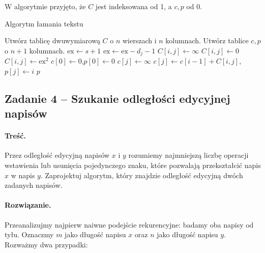 W algorytmie przyjęto, że $C$ jest indeksowana od 1, a $c,p$ od 0.
\begin{algorithm}[H]
	\caption{Algorytm łamania tekstu}\label{Zadanie13}

	\begin{algorithmic}[1]
			\State Utwórz tablicę dwuwymiarową $C$ o $n$ wierszach i $n$ kolumnach.
			\State Utwórz tablice $c,p$ o $n+1$ kolumnach.
				\State $\textrm{ex}\gets s+1$
					\State $\textrm{ex}\gets \textrm{ex} - d_j - 1$
						\State $C[i,j]\gets\infty$
						\State $C[i,j]\gets0$
					\Else
						\State $C[i,j]\gets\textrm{ex}^2$
					\EndIf
				\EndFor
			\EndFor
			\State $c[0]\gets0$,\quad$p[0]\gets0$
				\State $c[j]\gets\infty$
						\State $c[j]\gets c[i-1]+C[i,j]$,\qquad$p[j]\gets i$
					\EndIf
				\EndFor
			\EndFor
			\State \Return $p$
		\EndProcedure
	\end{algorithmic}
\end{algorithm}

\subsection{Zadanie 4 -- Szukanie odległości edycyjnej napisów}
\paragraph{Treść.} Przez odległość edycyjną napisów 
$x$ i $y$ rozumiemy najmniejszą liczbę operacji wstawienia lub usunięcia
pojedynczego znaku, które pozwalają przekształcić napis $x$ w napis $y$.
Zaprojektuj algorytm, który znajdzie odległość 
edycyjną dwóch zadanych napisów.


\paragraph{Rozwiązanie.}
Przeanalizujmy najpierw naiwne podejście rekurencyjne: badamy 
oba napisy od tyłu. Oznaczmy $m$ jako długość napisu $x$
oraz $n$ jako długość napisu $y$. Rozważmy dwa przypadki: 

